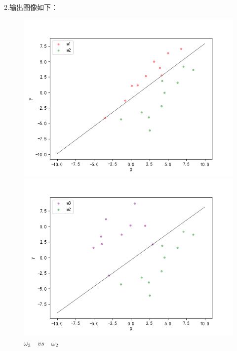 \documentclass[a4paper,11pt,onecolumn,oneside,UTF8]{article}
\begin{document}
2.输出图像如下：\\

\begin{figure}[H]
    \begin{minipage}[t]{0.5\linewidth}
        \centering
        \includegraphics[width=\textwidth]{hw3_3.png}
        \caption{ $\omega_1 \quad vs\quad \omega_2$ }
    \end{minipage}%
    \begin{minipage}[t]{0.5\linewidth}
        \centering
        \includegraphics[width=\textwidth]{hw3_4.png}
        \caption{ $\omega_3 \quad vs\quad \omega_2$ }
    \end{minipage}
\end{figure}
\end{document}
